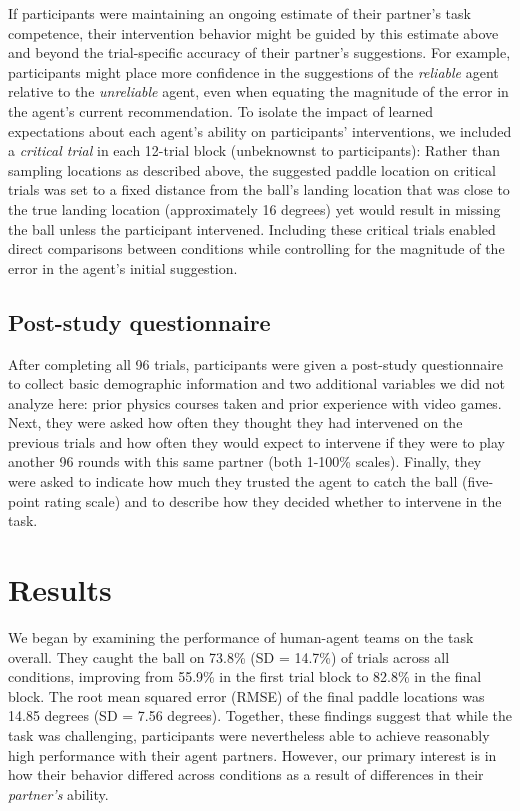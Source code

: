 \documentclass[10pt,letterpaper]{article}
\begin{document}
If participants were maintaining an ongoing estimate of their partner's task competence, their intervention behavior might be guided by this estimate above and beyond the trial-specific accuracy of their partner's suggestions. For example, participants might place more confidence in the suggestions of the \textit{reliable} agent relative to the \textit{unreliable} agent, even when equating the magnitude of the error in the agent's current recommendation. To isolate the impact of learned expectations about each agent's ability on participants' interventions, we included a \textit{critical trial} in each 12-trial block (unbeknownst to participants): Rather than sampling locations as described above, the suggested paddle location on critical trials was set to a fixed distance from the ball's landing location that was close to the true landing location (approximately 16 degrees) yet would result in missing the ball unless the participant intervened. Including these critical trials enabled direct comparisons between conditions while controlling for the magnitude of the error in the agent's initial suggestion.

\subsection{Post-study questionnaire}

After completing all 96 trials, participants were given a post-study questionnaire to collect basic demographic information and two additional variables we did not analyze here: prior physics courses taken and prior experience with video games. Next, they were asked how often they thought they had intervened on the previous trials and how often they would expect to intervene if they were to play another 96 rounds with this same partner (both 1-100\% scales). Finally, they were asked to indicate how much they trusted the agent to catch the ball (five-point rating scale) and to describe how they decided whether to intervene in the task. 


\section{Results}
We began by examining the performance of human-agent teams on the task overall. They caught the ball on 73.8\% (SD = 14.7\%) of trials across all conditions, improving from 55.9\% in the first trial block to 82.8\% in the final block. The root mean squared error (RMSE) of the final paddle locations was 14.85 degrees (SD = 7.56 degrees). Together, these findings suggest that while the task was challenging, participants were nevertheless able to achieve reasonably high performance with their agent partners. However, our primary interest is in how their behavior differed across conditions as a result of differences in their \textit{partner's} ability.
\end{document}
